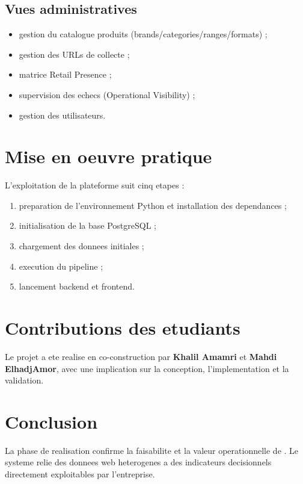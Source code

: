 \subsection{Vues administratives}
\begin{itemize}[leftmargin=1.2cm]
	\item gestion du catalogue produits (brands/categories/ranges/formats) ;
	\item gestion des URLs de collecte ;
	\item matrice Retail Presence ;
	\item supervision des echecs (Operational Visibility) ;
	\item gestion des utilisateurs.
\end{itemize}


\section{Mise en oeuvre pratique}
L'exploitation de la plateforme suit cinq etapes :
\begin{enumerate}[leftmargin=1.2cm]
	\item preparation de l'environnement Python et installation des dependances ;
	\item initialisation de la base PostgreSQL ;
	\item chargement des donnees initiales ;
	\item execution du pipeline ;
	\item lancement backend et frontend.
\end{enumerate}

\section{Contributions des etudiants}
Le projet a ete realise en co-construction par \textbf{Khalil Amamri} et \textbf{Mahdi ElhadjAmor}, avec une implication sur la conception, l'implementation et la validation.

\section{Conclusion}
La phase de realisation confirme la faisabilite et la valeur operationnelle de \ProjectName. Le systeme relie des donnees web heterogenes a des indicateurs decisionnels directement exploitables par l'entreprise.

\clearpage
